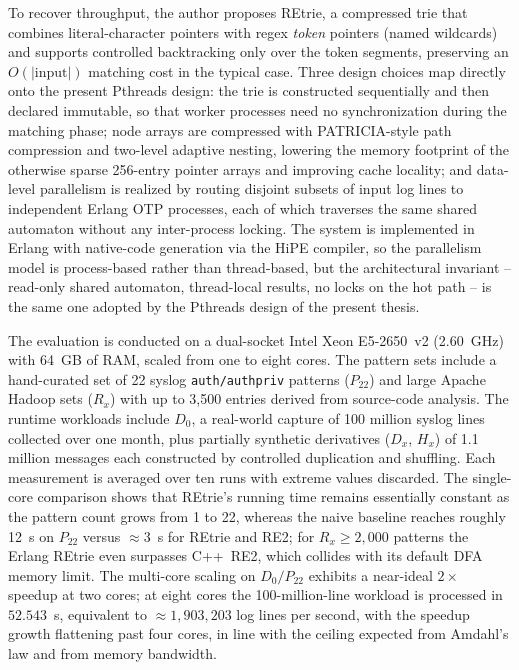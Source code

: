 To recover throughput, the author proposes REtrie, a compressed trie that combines literal-character pointers with regex \emph{token} pointers (named wildcards) and supports controlled backtracking only over the token segments, preserving an $O(|\text{input}|)$ matching cost in the typical case. Three design choices map directly onto the present Pthreads design: the trie is constructed sequentially and then declared immutable, so that worker processes need no synchronization during the matching phase; node arrays are compressed with PATRICIA-style path compression and two-level adaptive nesting, lowering the memory footprint of the otherwise sparse 256-entry pointer arrays and improving cache locality; and data-level parallelism is realized by routing disjoint subsets of input log lines to independent Erlang OTP processes, each of which traverses the same shared automaton without any inter-process locking. The system is implemented in Erlang with native-code generation via the HiPE compiler, so the parallelism model is process-based rather than thread-based, but the architectural invariant -- read-only shared automaton, thread-local results, no locks on the hot path -- is the same one adopted by the Pthreads design of the present thesis.

The evaluation is conducted on a dual-socket Intel Xeon E5-2650~v2 (2.60~GHz) with 64~GB of RAM, scaled from one to eight cores. The pattern sets include a hand-curated set of 22 syslog \texttt{auth/authpriv} patterns ($P_{22}$) and large Apache Hadoop sets ($R_{x}$) with up to 3,500 entries derived from source-code analysis. The runtime workloads include $D_0$, a real-world capture of 100 million syslog lines collected over one month, plus partially synthetic derivatives ($D_x$, $H_x$) of 1.1 million messages each constructed by controlled duplication and shuffling. Each measurement is averaged over ten runs with extreme values discarded. The single-core comparison shows that REtrie's running time remains essentially constant as the pattern count grows from 1 to 22, whereas the naive baseline reaches roughly 12~s on $P_{22}$ versus ${\approx}3$~s for REtrie and RE2; for $R_x \geq 2{,}000$ patterns the Erlang REtrie even surpasses C++~RE2, which collides with its default DFA memory limit. The multi-core scaling on $D_0/P_{22}$ exhibits a near-ideal $2\times$ speedup at two cores; at eight cores the 100-million-line workload is processed in $52.543$~s, equivalent to ${\approx}1{,}903{,}203$ log lines per second, with the speedup growth flattening past four cores, in line with the ceiling expected from Amdahl's law \cite{Amdahl1967} and from memory bandwidth.

